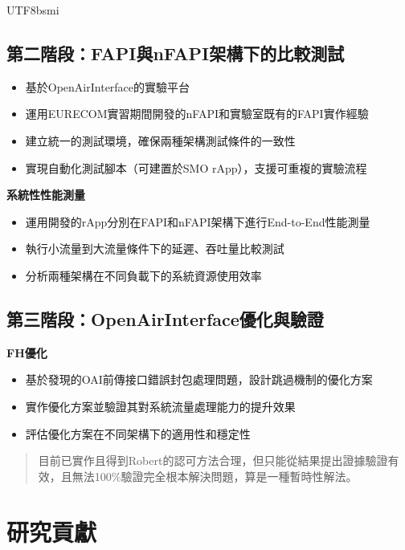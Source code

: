 \documentclass[conference]{IEEEtran}
\begin{document}
\begin{CJK}{UTF8}{bsmi}
{\subsection{第二階段：FAPI與nFAPI架構下的比較測試}
\begin{itemize}
    \item 基於OpenAirInterface的實驗平台
    \item 運用EURECOM實習期間開發的nFAPI和實驗室既有的FAPI實作經驗
    \item 建立統一的測試環境，確保兩種架構測試條件的一致性
    \item 實現自動化測試腳本（可建置於SMO rApp），支援可重複的實驗流程
\end{itemize}

\textbf{系統性性能測量}
\begin{itemize}
    \item 運用開發的rApp分別在FAPI和nFAPI架構下進行End-to-End性能測量
    \item 執行小流量到大流量條件下的延遲、吞吐量比較測試
    \item 分析兩種架構在不同負載下的系統資源使用效率
\end{itemize}

\subsection{第三階段：OpenAirInterface優化與驗證}
\textbf{FH優化}
\begin{itemize}
    \item [暫定] 基於發現的OAI前傳接口錯誤封包處理問題，設計跳過機制的優化方案
    \item [暫定] 實作優化方案並驗證其對系統流量處理能力的提升效果
    \item [暫定] 評估優化方案在不同架構下的適用性和穩定性
\end{itemize}

\begin{quote}
目前已實作且得到Robert的認可方法合理，但只能從結果提出證據驗證有效，且無法100\%驗證完全根本解決問題，算是一種暫時性解法。
\end{quote}


\section{研究貢獻}

}
\end{CJK}
\end{document}
